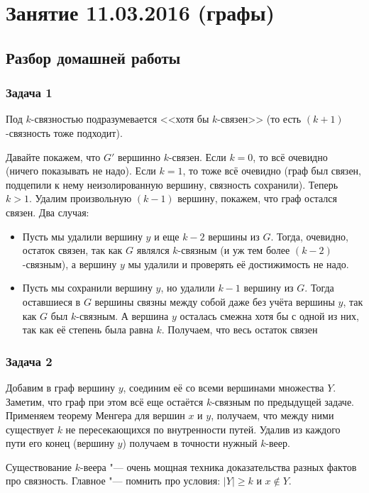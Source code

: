 \chapter{Занятие 11.03.2016 (графы)}
\section{Разбор домашней работы}

\subsection{Задача 1}
	\begin{Rem}
		Под $k$-связностью подразумевается <<хотя бы $k$-связен>> (то есть $(k+1)$-связность тоже подходит).
	\end{Rem}
	Давайте покажем, что $G'$ вершинно $k$-связен.
	Если $k=0$, то всё очевидно (ничего показывать не надо).
	Если $k=1$, то тоже всё очевидно (граф был связен, подцепили к нему неизолированную вершину, связность сохранили).
	Теперь $k > 1$.
	Удалим произвольную $(k-1)$ вершину, покажем, что граф остался связен.
	Два случая:
	\begin{itemize}
		\item
			Пусть мы удалили вершину $y$ и еще $k-2$ вершины из $G$.
			Тогда, очевидно, остаток связен, так как $G$ являлся $k$-связным
			(и уж тем более $(k-2)$-связным), а вершину $y$ мы удалили и проверять
			её достижимость не надо.
		\item
			Пусть мы сохранили вершину $y$, но удалили $k-1$ вершину из $G$.
			Тогда оставшиеся в $G$ вершины связны между собой даже без учёта вершины $y$,
			так как $G$ был $k$-связным.
			А вершина $y$ осталась смежна хотя бы с одной из них, так как её степень была
			равна $k$.
			Получаем, что весь остаток связен
	\end{itemize}

\subsection{Задача 2}
	Добавим в граф вершину $y$, соединим её со всеми вершинами множества $Y$.
	Заметим, что граф при этом всё еще остаётся $k$-связным по предыдущей задаче.
	Применяем теорему Менгера для вершин $x$ и $y$, получаем, что между ними
	существует $k$ не пересекающихся по внутренности путей.
	Удалив из каждого пути его конец (вершину $y$) получаем в точности нужный $k$-веер.
	\begin{Rem}
		Существование $k$-веера "--- очень мощная техника доказательства разных фактов про связность.
		Главное "--- помнить про условия: $|Y|\ge k$ и $x\notin Y$.
	\end{Rem}


